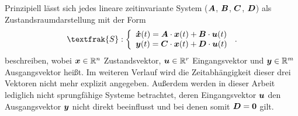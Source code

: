 Prinzipiell lässt sich jedes lineare zeitinvariante System 
($\boldsymbol{A}$, $\boldsymbol{B}$, $\boldsymbol{C}$, $\boldsymbol{D}$) als Zustandsraumdarstellung mit der Form
\begin{equation}
\textfrak{S} 
: \left\{ \begin{array}{ll}
\bs{\dot{x}}(t) = \bs{A}\cdot \bs{x}(t) + \bs{B}\cdot \bs{u}(t) \\
\bs{y}(t) = \bs{C}\cdot \bs{x}(t) + \bs{D}\cdot \bs{u}(t)
\end{array}
\right.\,.
\end{equation}
beschreiben, wobei $\boldsymbol{x} \in \mathbb{R}^n$ Zustandsvektor, $\boldsymbol{u} \in \mathbb{R}^r$ Eingangsvektor und $\boldsymbol{y} \in \mathbb{R}^m$ Ausgangsvektor heißt. Im weiteren Verlauf wird die Zeitabhängigkeit dieser drei Vektoren nicht mehr explizit angegeben. Außerdem werden in dieser Arbeit lediglich nicht sprungfähige Systeme  betrachtet, deren Eingangsvektor $\boldsymbol{u}$ den Ausgangsvektor $\boldsymbol{y}$ nicht direkt beeinflusst und bei denen somit $\boldsymbol{D} = \boldsymbol{0}$ gilt.

